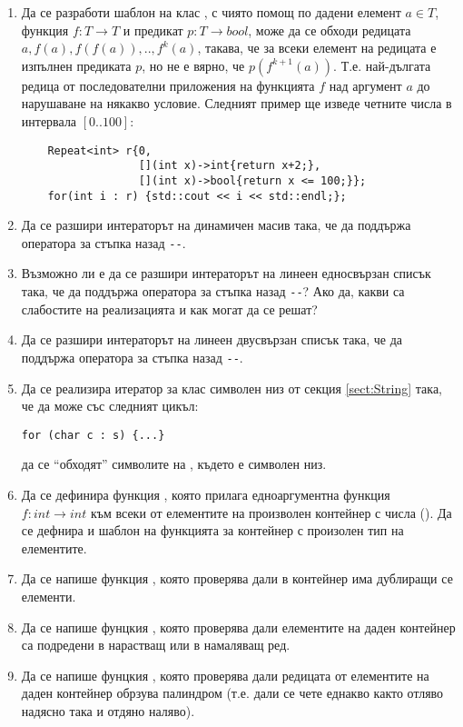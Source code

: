 \begin{enumerate}
  \item Да се разработи шаблон на клас , с чиято помощ по дадени елемент $a \in T$, функция $f:T \rightarrow T$ и предикат $p:T \rightarrow bool$, може да се обходи редицата $a,f(a),f(f(a)),..,f^k(a)$, такава, че за всеки елемент на редицата е изпълнен предиката $p$, но не е вярно, че $p(f^{k+1}(a))$. Т.е. най-дългата редица от последователни приложения на функцията $f$ над аргумент $a$ до нарушаване на някакво условие. Следният пример ще изведе четните числа в интервала $[0..100]$:
  \begin{verbatim}
    Repeat<int> r{0,
                  [](int x)->int{return x+2;},
                  [](int x)->bool{return x <= 100;}};
    for(int i : r) {std::cout << i << std::endl;};
  \end{verbatim}  
  
	\item Да се разшири интераторът на динамичен масив така, че да поддържа оператора за стъпка назад \texttt{-{}-}.

  \item Възможно ли е да се разшири интераторът на линеен едносвързан списък така, че да поддържа оператора за стъпка назад \texttt{-{}-}? Ако да, какви са слабостите на реализацията и как могат да се решат?

  \item Да се разшири интераторът на линеен двусвързан списък така, че да поддържа оператора за стъпка назад \texttt{-{}-}.

  \item Да се реализира итератор за клас символен низ от секция \ref{sect:String} така, че да може със следният цикъл:
  
\begin{verbatim}
for (char c : s) {...}
\end{verbatim}

  да се ``обходят'' символите на , където  е символен низ.

	\item  Да се дефинира функция , която прилага едноаргументна функция $f:int \rightarrow int$ към всеки от елементите на произволен контейнер с числа (). Да се дефнира и шаблон на функцията за контейнер с произолен тип на елементите.

	\item Да се напише функция , която проверява дали в контейнер има дублиращи се елементи.

	\item Да се напише фунцкия , която проверява дали елементите на даден контейнер са подредени в нарастващ или в намаляващ ред.

	\item Да се напише фунцкия , която проверява дали редицата от елементите на даден контейнер обрзува палиндром (т.е. дали се чете еднакво както отляво надясно така и отдяно наляво).
    
\end{enumerate}

